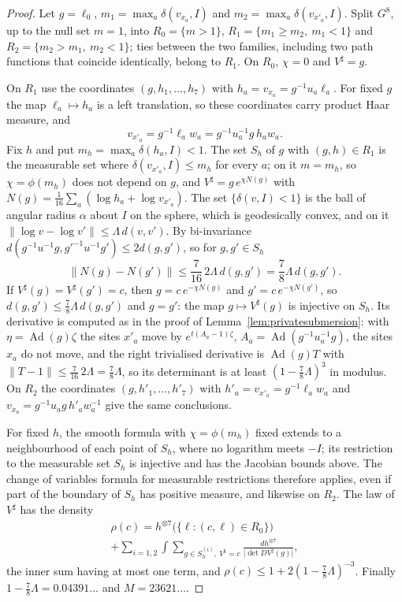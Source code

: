 \documentclass[11pt]{amsart}
\theoremstyle{definition}
\theoremstyle{remark}
\numberwithin{equation}{section}
\begin{document}
\begin{proof}
Let $g=\ell_0$, $m_1=\max_a\delta(v_{x_a},I)$ and
$m_2=\max_a\delta(v_{x'_a},I)$. Split $G^8$, up to the null set $m=1$,
into $R_0=\{m>1\}$, $R_1=\{m_1\ge m_2,\ m_1<1\}$ and
$R_2=\{m_2>m_1,\ m_2<1\}$; ties between the two families, including two
path functions that coincide identically, belong to $R_1$. On $R_0$,
$\chi=0$ and $V^\sharp=g$.

On $R_1$ use the coordinates $(g,h_1,\dots,h_7)$ with $h_a=v_{x_a}=g^{-1}u_a
\ell_a$. For fixed $g$ the map $\ell_a\mapsto h_a$ is a left translation, so
these coordinates carry product Haar measure, and
\[
v_{x'_a}=g^{-1}\ell_aw_a=g^{-1}u_a^{-1}g\,h_aw_a .
\]
Fix $h$ and put $m_h=\max_a\delta(h_a,I)<1$. The set $S_h$ of $g$ with $(g,h)
\in R_1$ is the measurable set where $\delta(v_{x'_a},I)\le m_h$ for every $a$; on it
$m=m_h$, so $\chi=\phi(m_h)$ does not depend on $g$, and $V^\sharp=g\,e^{\chi
N(g)}$ with $N(g)=\frac1{16}\sum_a(\log h_a+\log v_{x'_a})$. The set
$\{\delta(v,I)<1\}$ is the ball of angular radius $\alpha$ about $I$ on the
sphere, which is geodesically convex, and on it $\lVert\log v-\log v'\rVert
\le\Lambda\,d(v,v')$. By bi-invariance $d(g^{-1}u^{-1}g,g'^{-1}u^{-1}g')\le
2d(g,g')$, so for $g,g'\in S_h$
\[
\lVert N(g)-N(g')\rVert\le\frac7{16}\,2\Lambda\,d(g,g')=\frac78\Lambda\,
d(g,g').
\]
If $V^\sharp(g)=V^\sharp(g')=c$, then $g=c\,e^{-\chi N(g)}$ and $g'=c\,
e^{-\chi N(g')}$, so $d(g,g')\le\frac78\Lambda\,d(g,g')$ and $g=g'$: the map
$g\mapsto V^\sharp(g)$ is injective on $S_h$. Its derivative is computed as
in the proof of Lemma~\ref{lem:privatesubmersion}: with $\eta=\operatorname
{Ad}(g)\zeta$ the sites $x'_a$ move by $e^{t(A_a-1)\zeta}$, $A_a=
\operatorname{Ad}(g^{-1}u_a^{-1}g)$, the sites $x_a$ do not move, and the
right trivialised derivative is $\operatorname{Ad}(g)T$ with $\lVert T-1
\rVert\le\frac7{16}\,2\Lambda=\frac78\Lambda$, so its determinant is at
least $(1-\frac78\Lambda)^3$ in modulus. On $R_2$ the coordinates $(g,h'_1,
\dots,h'_7)$ with $h'_a=v_{x'_a}=g^{-1}\ell_aw_a$ and $v_{x_a}=g^{-1}u_ag
\,h'_aw_a^{-1}$ give the same conclusions.

For fixed $h$, the smooth formula with $\chi=\phi(m_h)$ fixed extends to
a neighbourhood of each point of $S_h$, where no logarithm meets $-I$; its
restriction to the measurable set $S_h$ is injective and has the Jacobian
bounds above. The change of variables formula for measurable restrictions
therefore applies, even if part of the boundary of $S_h$ has positive
measure, and likewise on $R_2$. The law of $V^\sharp$ has the density
\begin{multline}\label{eq:densityformula}
\rho(c)=h^{\otimes7}\bigl(\{\ell:(c,\ell)\in R_0\}\bigr)\\
+\sum_{i=1,2}\int\sum_{g\in S^{(i)}_h,\ V^\sharp=c}\frac{dh^{\otimes7}}
{\lvert\det DV^\sharp(g)\rvert},
\end{multline}
the inner sum having at most one term, and $\rho(c)\le1+2(1-\frac78\Lambda
)^{-3}$. Finally $1-\frac78\Lambda=0.04391\ldots$ and $M=23621\ldots$.
\end{proof}
\end{document}

